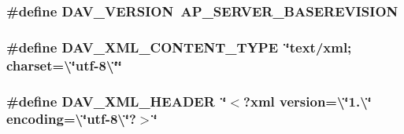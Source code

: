 \subsubsection[{\texorpdfstring{D\+A\+V\+\_\+\+V\+E\+R\+S\+I\+ON}{DAV_VERSION}}]{\setlength{\rightskip}{0pt plus 5cm}\#define D\+A\+V\+\_\+\+V\+E\+R\+S\+I\+ON~{\bf A\+P\+\_\+\+S\+E\+R\+V\+E\+R\+\_\+\+B\+A\+S\+E\+R\+E\+V\+I\+S\+I\+ON}}\hypertarget{group__MOD__DAV_gaf17ddfe12ada03a45c94d0118f3d98ed}{}\label{group__MOD__DAV_gaf17ddfe12ada03a45c94d0118f3d98ed}
\subsubsection[{\texorpdfstring{D\+A\+V\+\_\+\+X\+M\+L\+\_\+\+C\+O\+N\+T\+E\+N\+T\+\_\+\+T\+Y\+PE}{DAV_XML_CONTENT_TYPE}}]{\setlength{\rightskip}{0pt plus 5cm}\#define D\+A\+V\+\_\+\+X\+M\+L\+\_\+\+C\+O\+N\+T\+E\+N\+T\+\_\+\+T\+Y\+PE~\char`\"{}text/xml; charset=\textbackslash{}\char`\"{}utf-\/8\textbackslash{}\char`\"{}\char`\"{}}\hypertarget{group__MOD__DAV_gac3871a7e80b1d24a0fe3ca946e546c64}{}\label{group__MOD__DAV_gac3871a7e80b1d24a0fe3ca946e546c64}
\subsubsection[{\texorpdfstring{D\+A\+V\+\_\+\+X\+M\+L\+\_\+\+H\+E\+A\+D\+ER}{DAV_XML_HEADER}}]{\setlength{\rightskip}{0pt plus 5cm}\#define D\+A\+V\+\_\+\+X\+M\+L\+\_\+\+H\+E\+A\+D\+ER~\char`\"{}$<$?xml version=\textbackslash{}\char`\"{}1.\textbackslash{}\char`\"{} {\bf encoding}=\textbackslash{}\char`\"{}utf-\/8\textbackslash{}\char`\"{}?$>$\char`\"{}}\hypertarget{group__MOD__DAV_ga09257098b526bed329d659455dca36c1}{}\label{group__MOD__DAV_ga09257098b526bed329d659455dca36c1}
